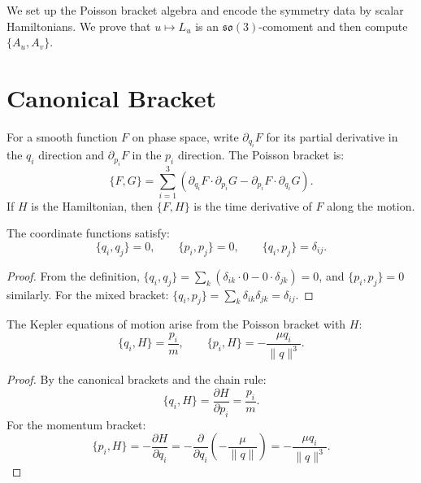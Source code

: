We set up the Poisson bracket algebra and encode the symmetry data by scalar Hamiltonians.
We prove that $u \mapsto L_u$ is an $\mathfrak{so}(3)$-comoment and then compute $\{A_u, A_v\}$.

\section{Canonical Bracket}

\begin{definition}\label{def:poisson-bracket}
For a smooth function $F$ on phase space, write $\partial_{q_i}F$ for its partial derivative in the $q_i$ direction and $\partial_{p_i}F$ in the $p_i$ direction.
The Poisson bracket is:
\[
  \{F, G\}
  = \sum_{i=1}^3 \!\left(\partial_{q_i}F \cdot \partial_{p_i}G - \partial_{p_i}F \cdot \partial_{q_i}G\right).
\]
If $H$ is the Hamiltonian, then $\{F,H\}$ is the time derivative of $F$ along the motion.
\leanok
\end{definition}

\begin{lemma}\label{thm:basic-canonical-brackets}
The coordinate functions satisfy:
\[
  \{q_i, q_j\} = 0,
  \qquad
  \{p_i, p_j\} = 0,
  \qquad
  \{q_i, p_j\} = \delta_{ij}.
\]
\leanok
\begin{proof}
From the definition, $\{q_i, q_j\} = \sum_k(\delta_{ik} \cdot 0 - 0 \cdot \delta_{jk}) = 0$, and $\{p_i, p_j\} = 0$ similarly.
For the mixed bracket: $\{q_i, p_j\} = \sum_k \delta_{ik}\delta_{jk} = \delta_{ij}$.
\end{proof}
\end{lemma}

\begin{theorem}\label{thm:poisson-kepler}
The Kepler equations of motion arise from the Poisson bracket with $H$:
\[
  \{q_i, H\} = \frac{p_i}{m},
  \qquad
  \{p_i, H\} = -\frac{\mu q_i}{\|q\|^3}.
\]
\leanok
\begin{proof}
By the canonical brackets and the chain rule:
\[
  \{q_i, H\} = \frac{\partial H}{\partial p_i} = \frac{p_i}{m}.
\]
For the momentum bracket:
\[
  \{p_i, H\} = -\frac{\partial H}{\partial q_i}
  = -\frac{\partial}{\partial q_i}\!\left(-\frac{\mu}{\|q\|}\right)
  = -\frac{\mu q_i}{\|q\|^3}.
\]
\end{proof}
\end{theorem}

